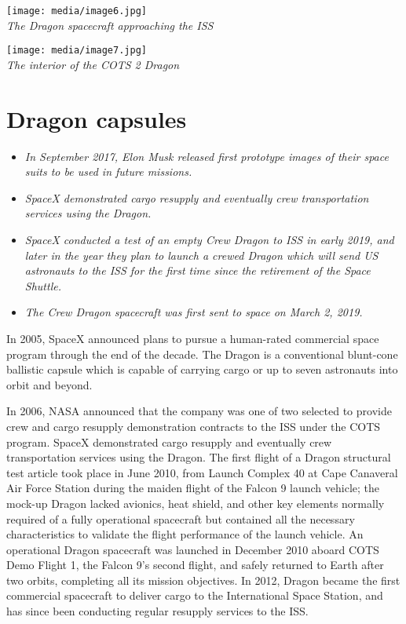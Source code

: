 \texttt{[image: media/image6.jpg]}\\
\emph{The Dragon spacecraft approaching the ISS}

\texttt{[image: media/image7.jpg]}\\
\emph{The interior of the COTS 2 Dragon}

\section{Dragon capsules}\label{dragon-capsules}

\begin{itemize}
\item
  \emph{In September 2017, Elon Musk released first prototype images of
  their space suits to be used in future missions.}
\item
  \emph{SpaceX demonstrated cargo resupply and eventually crew
  transportation services using the Dragon.}
\item
  \emph{SpaceX conducted a test of an empty Crew Dragon to ISS in early
  2019, and later in the year they plan to launch a crewed Dragon which
  will send US astronauts to the ISS for the first time since the
  retirement of the Space Shuttle.}
\item
  \emph{The Crew Dragon spacecraft was first sent to space on March 2,
  2019.}
\end{itemize}

In 2005, SpaceX announced plans to pursue a human-rated commercial space
program through the end of the decade. The Dragon is a conventional
blunt-cone ballistic capsule which is capable of carrying cargo or up to
seven astronauts into orbit and beyond.

In 2006, NASA announced that the company was one of two selected to
provide crew and cargo resupply demonstration contracts to the ISS under
the COTS program. SpaceX demonstrated cargo resupply and eventually crew
transportation services using the Dragon. The first flight of a Dragon
structural test article took place in June 2010, from Launch Complex 40
at Cape Canaveral Air Force Station during the maiden flight of the
Falcon 9 launch vehicle; the mock-up Dragon lacked avionics, heat
shield, and other key elements normally required of a fully operational
spacecraft but contained all the necessary characteristics to validate
the flight performance of the launch vehicle. An operational Dragon
spacecraft was launched in December 2010 aboard COTS Demo Flight 1, the
Falcon 9's second flight, and safely returned to Earth after two orbits,
completing all its mission objectives. In 2012, Dragon became the first
commercial spacecraft to deliver cargo to the International Space
Station, and has since been conducting regular resupply services to the
ISS.

